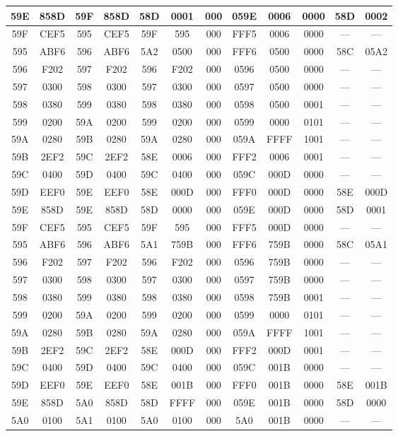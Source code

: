 \begin{center}
\begin{tabular}{|c|c|c|c|c|c|c|c|c|c|c|c|}
		\hline
		59E & 858D & 59F & 858D & 58D & 0001 & 000 & 059E & 0006 & 0000 & 58D & 0002\\
		\hline
		59F & CEF5 & 595 & CEF5 & 59F & 595 & 000 & FFF5 & 0006 & 0000 & --- & ---\\
		\hline
		595 & ABF6 & 596 & ABF6 & 5A2 & 0500 & 000 & FFF6 & 0500 & 0000 & 58C & 05A2\\
		\hline
		596 & F202 & 597 & F202 & 596 & F202 & 000 & 0596 & 0500 & 0000 & --- & ---\\
		\hline
		597 & 0300 & 598 & 0300 & 597 & 0300 & 000 & 0597 & 0500 & 0000 & --- & ---\\
		\hline
		598 & 0380 & 599 & 0380 & 598 & 0380 & 000 & 0598 & 0500 & 0001 & --- & ---\\
		\hline
		599 & 0200 & 59A & 0200 & 599 & 0200 & 000 & 0599 & 0000 & 0101 & --- & ---\\
		\hline
		59A & 0280 & 59B & 0280 & 59A & 0280 & 000 & 059A & FFFF & 1001 & --- & ---\\
		\hline
		59B & 2EF2 & 59C & 2EF2 & 58E & 0006 & 000 & FFF2 & 0006 & 0001 & --- & ---\\
		\hline
		59C & 0400 & 59D & 0400 & 59C & 0400 & 000 & 059C & 000D & 0000 & --- & ---\\
		\hline
		59D & EEF0 & 59E & EEF0 & 58E & 000D & 000 & FFF0 & 000D & 0000 & 58E & 000D\\
		\hline
		59E & 858D & 59E & 858D & 58D & 0000 & 000 & 059E & 000D & 0000 & 58D & 0001\\
		\hline
		59F & CEF5 & 595 & CEF5 & 59F & 595 & 000 & FFF5 & 000D & 0000 & --- & ---\\
		\hline
		595 & ABF6 & 596 & ABF6 & 5A1 & 759B & 000 & FFF6 & 759B & 0000 & 58C & 05A1\\
		\hline
		596 & F202 & 597 & F202 & 596 & F202 & 000 & 0596 & 759B & 0000 & --- & ---\\
		\hline
		597 & 0300 & 598 & 0300 & 597 & 0300 & 000 & 0597 & 759B & 0000 & --- & ---\\
		\hline
		598 & 0380 & 599 & 0380 & 598 & 0380 & 000 & 0598 & 759B & 0001 & --- & ---\\
		\hline
		599 & 0200 & 59A & 0200 & 599 & 0200 & 000 & 0599 & 0000 & 0101 & --- & ---\\
		\hline
		59A & 0280 & 59B & 0280 & 59A & 0280 & 000 & 059A & FFFF & 1001 & --- & ---\\
		\hline
		59B & 2EF2 & 59C & 2EF2 & 58E & 000D & 000 & FFF2 & 000D & 0001 & --- & ---\\
		\hline
		59C & 0400 & 59D & 0400 & 59C & 0400 & 000 & 059C & 001B & 0000 & --- & ---\\
		\hline
		59D & EEF0 & 59E & EEF0 & 58E & 001B & 000 & FFF0 & 001B & 0000 & 58E & 001B\\
		\hline
		59E & 858D & 5A0 & 858D & 58D & FFFF & 000 & 059E & 001B & 0000 & 58D & 0000\\
		\hline
		5A0 & 0100 & 5A1 & 0100 & 5A0 & 0100 & 000 & 5A0 & 001B & 0000 & --- & ---\\
		\hline
	\end{tabular}
\end{center}

